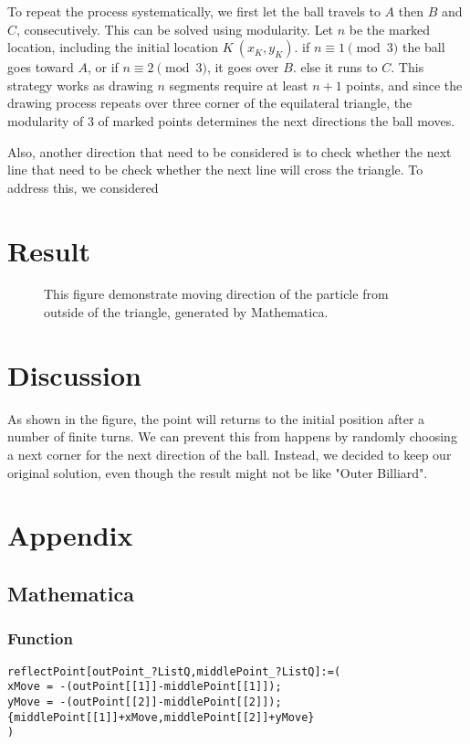 \documentclass[a4paper,11pt]{article}
\begin{document}
To repeat the process systematically, we first let the ball travels to \(A\) then \(B\) and \(C\), consecutively. This can be solved using modularity. Let \(n\) be the marked location, including the initial location \(K \ (x_K, y_K)\). if \(n \equiv 1 \pmod 3\) the ball goes toward \(A\), or if \(n \equiv 2 \pmod 3\), it goes over \(B\). else it runs to \(C\). This strategy works as drawing \(n\) segments require at least \(n+1\) points, and since the drawing process repeats over three corner of the equilateral triangle, the modularity of 3 of marked points determines the next directions the ball moves.

Also, another direction that need to be considered is to check whether the next line that need to be check whether the next line will cross the triangle. To address this, we considered 

\section{Result}
\begin{figure}
\centering
{}
\caption{This figure demonstrate moving direction of the particle from outside of the triangle, generated by Mathematica.}
\end{figure}

\section{Discussion}
As shown in the figure, the point will returns to the initial position after a number of finite turns. We can prevent this from happens by randomly choosing a next corner for the next direction of the ball. Instead, we decided to keep our original solution, even though the result might not be like "Outer Billiard".

\pagebreak
\section{Appendix}
\subsection{Mathematica}
\subsubsection{Function}
\lstset{language=Mathematica}
\begin{lstlisting}
reflectPoint[outPoint_?ListQ,middlePoint_?ListQ]:=(
xMove = -(outPoint[[1]]-middlePoint[[1]]);
yMove = -(outPoint[[2]]-middlePoint[[2]]);
{middlePoint[[1]]+xMove,middlePoint[[2]]+yMove}
)
\end{lstlisting}
\end{document}
